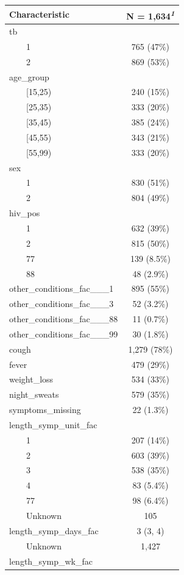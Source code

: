 \documentclass[
  letterpaper,
]{latex/krantz}
\begin{document}
\setlength{\LTpost}{0mm}
\begin{longtable*}{lc}
\toprule
\textbf{Characteristic} & \textbf{N = 1,634}\textsuperscript{\textit{1}} \\ 
\midrule\addlinespace[2.5pt]
tb &  \\ 
    1 & 765 (47\%) \\ 
    2 & 869 (53\%) \\ 
age\_group &  \\ 
    [15,25) & 240 (15\%) \\ 
    [25,35) & 333 (20\%) \\ 
    [35,45) & 385 (24\%) \\ 
    [45,55) & 343 (21\%) \\ 
    [55,99) & 333 (20\%) \\ 
sex &  \\ 
    1 & 830 (51\%) \\ 
    2 & 804 (49\%) \\ 
hiv\_pos &  \\ 
    1 & 632 (39\%) \\ 
    2 & 815 (50\%) \\ 
    77 & 139 (8.5\%) \\ 
    88 & 48 (2.9\%) \\ 
other\_conditions\_fac\_\_\_1 & 895 (55\%) \\ 
other\_conditions\_fac\_\_\_3 & 52 (3.2\%) \\ 
other\_conditions\_fac\_\_\_88 & 11 (0.7\%) \\ 
other\_conditions\_fac\_\_\_99 & 30 (1.8\%) \\ 
cough & 1,279 (78\%) \\ 
fever & 479 (29\%) \\ 
weight\_loss & 534 (33\%) \\ 
night\_sweats & 579 (35\%) \\ 
symptoms\_missing & 22 (1.3\%) \\ 
length\_symp\_unit\_fac &  \\ 
    1 & 207 (14\%) \\ 
    2 & 603 (39\%) \\ 
    3 & 538 (35\%) \\ 
    4 & 83 (5.4\%) \\ 
    77 & 98 (6.4\%) \\ 
    Unknown & 105 \\ 
length\_symp\_days\_fac & 3 (3, 4) \\ 
    Unknown & 1,427 \\ 
length\_symp\_wk\_fac &  \\ 

\end{longtable*}
\end{document}
